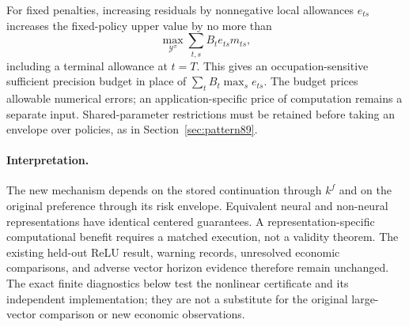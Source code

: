For fixed penalties, increasing residuals by nonnegative local allowances $e_{ts}$ increases the fixed-policy upper value by no more than
\begin{equation}\label{eq:occupation-budget92}
 \max_{\mathcal Y^\pi}\sum_{t,s}B_t e_{ts}m_{ts},
\end{equation}
including a terminal allowance at $t=T$. This gives an occupation-sensitive sufficient precision budget in place of $\sum_t B_t\max_s e_{ts}$. The budget prices allowable numerical errors; an application-specific price of computation remains a separate input. Shared-parameter restrictions must be retained before taking an envelope over policies, as in Section~\ref{sec:pattern89}.

\paragraph{Interpretation.}
The new mechanism depends on the stored continuation through $k^f$ and on the original preference through its risk envelope. Equivalent neural and non-neural representations have identical centered guarantees. A representation-specific computational benefit requires a matched execution, not a validity theorem. The existing held-out ReLU result, warning records, unresolved economic comparisons, and adverse vector horizon evidence therefore remain unchanged. The exact finite diagnostics below test the nonlinear certificate and its independent implementation; they are not a substitute for the original large-vector comparison or new economic observations.
